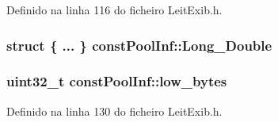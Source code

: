Definido na linha 116 do ficheiro Leit\-Exib.\-h.

\hypertarget{structconst_pool_inf_a25e99a2c4f18168165ed83b5f4cfe234}{
\subsubsection[{Long\-\_\-\-Double}]{\setlength{\rightskip}{0pt plus 5cm}struct \{ ... \}   const\-Pool\-Inf\-::\-Long\-\_\-\-Double}}\label{structconst_pool_inf_a25e99a2c4f18168165ed83b5f4cfe234}
\hypertarget{structconst_pool_inf_a15471799757777098756cc8ec1cd9a3c}{
\subsubsection[{low\-\_\-bytes}]{\setlength{\rightskip}{0pt plus 5cm}uint32\-\_\-t const\-Pool\-Inf\-::low\-\_\-bytes}}\label{structconst_pool_inf_a15471799757777098756cc8ec1cd9a3c}


Definido na linha 130 do ficheiro Leit\-Exib.\-h.


